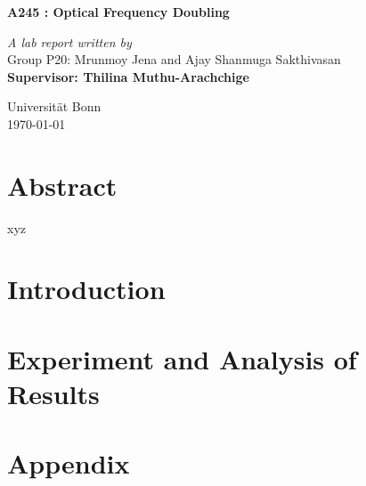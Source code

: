 \documentclass[a4paper]{report}
\begin{document}
\begin{onehalfspace}
\vspace*{0.5in}
\begin{center}
\begin{LARGE}
\textbf{A245 : Optical Frequency Doubling}\\ 
\end{LARGE}
\bigskip
\bigskip
\textit{A lab report written by}\\
Group P20: Mrunmoy Jena and Ajay Shanmuga Sakthivasan\\
\medskip
\textbf{Supervisor: Thilina Muthu-Arachchige}\\
\vspace*{5in}
\begin{flushright}
Universit\"{a}t	Bonn\\
\today
\end{flushright}
\end{center}
\tableofcontents
\chapter*{Abstract}
xyz
\chapter{Introduction}
%
\chapter{Experiment and Analysis of Results}

\end{onehalfspace}
\printbibliography

\appendix
\chapter{Appendix}

\end{document}
